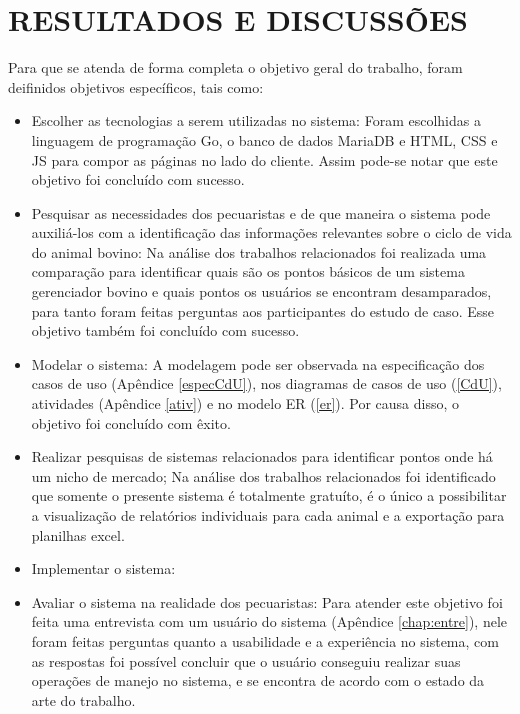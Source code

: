 %
%


\chapter{\textbf{RESULTADOS E DISCUSSÕES}}\label{chap:resultados}

Para que se atenda de forma completa o objetivo geral do trabalho, foram deifinidos objetivos específicos, tais como:
\begin{itemize}
	\item Escolher as tecnologias a serem utilizadas no sistema:
	Foram escolhidas a linguagem de programação Go, o banco de dados MariaDB e HTML, CSS e JS para compor as páginas no lado do cliente. Assim pode-se notar que este objetivo foi concluído com sucesso.

	\item Pesquisar as necessidades dos pecuaristas e de que maneira o sistema pode auxiliá-los com a identificação das informações relevantes sobre o ciclo de vida do animal bovino:
	Na análise dos trabalhos relacionados foi realizada uma comparação para identificar quais são os pontos básicos de um sistema gerenciador bovino e quais pontos os usuários se encontram desamparados, para tanto foram feitas perguntas aos participantes do estudo de caso. Esse objetivo também foi concluído com sucesso.

	\item Modelar o sistema:
	A modelagem pode ser observada na especificação dos casos de uso (Apêndice \ref{especCdU}),  nos diagramas de casos de uso (\ref{CdU}), atividades (Apêndice \ref{ativ}) e no modelo ER (\ref{er}). Por causa disso, o objetivo foi concluído com êxito.


	\item Realizar pesquisas de sistemas relacionados para identificar pontos onde há um nicho de mercado;
	Na análise dos trabalhos relacionados foi identificado que somente o presente sistema é totalmente gratuíto, é o único a possibilitar a visualização de relatórios individuais para cada animal e a exportação para planilhas excel.

	\item Implementar o sistema:


	\item Avaliar o sistema na realidade dos pecuaristas:
	Para atender este objetivo foi feita uma entrevista com um usuário do sistema (Apêndice \ref{chap:entre}), nele foram feitas perguntas quanto a usabilidade e a experiência no sistema, com as respostas foi possível concluir que o usuário conseguiu realizar suas operações de manejo no sistema, e se encontra de acordo com o estado da arte do trabalho.
\end{itemize}
